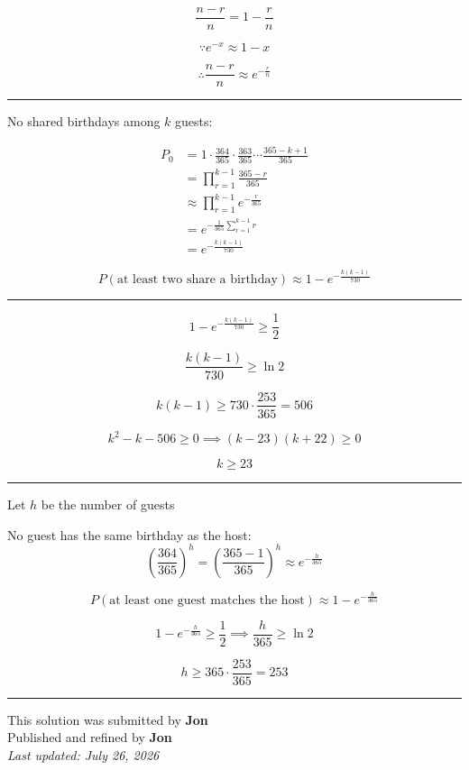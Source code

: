 \documentclass[12pt]{article}
\begin{document}
\newcommand{\ds}{\displaystyle}

$$\frac{n-r}{n}=1-\frac r n$$

$$\because e^{-x}\approx 1-x$$

$$\therefore \frac{n-r}{n}\approx e^{-\frac rn}$$

\bigskip\hrule\bigskip

No shared birthdays among $k$ guests:

\begin{align*}
P_0
&=1\cdot\frac{364}{365}\cdot\frac{363}{365}\cdots\frac{365-k+1}{365}\\
&=\prod_{r=1}^{k-1}\frac{365-r}{365}\\
&\approx \prod_{r=1}^{k-1}e^{-\frac r{365}}\\
&=e^{-\frac1{365}\sum_{r=1}^{k-1}r}\\
&=e^{-\frac{k(k-1)}{730}}
\end{align*}

$$P(\text{at least two share a birthday})
\approx 1-e^{-\frac{k(k-1)}{730}}$$

\bigskip\hrule\bigskip

$$1-e^{-\frac{k(k-1)}{730}}\geq\frac12$$

$$\frac{k(k-1)}{730}\geq \ln2$$

$$k(k-1)\geq 730\cdot\frac{253}{365}=506$$

$$k^2-k-506\geq 0\implies (k-23)(k+22)\geq 0$$

$$k\geq23$$

\bigskip\hrule\bigskip

Let $h$ be the number of guests

No guest has the same birthday as the host: 
$$\left(\frac{364}{365}\right)^h=\left(\frac{365-1}{365}\right)^h\approx e^{-\frac h{365}}$$

$$P(\text{at least one guest matches the host})\approx 1-e^{-\frac h{365}}$$

$$1-e^{-\frac h{365}}\geq\frac12\implies \frac h{365}\geq \ln2$$

$$h\geq365\cdot\frac{253}{365}=253$$

\bigskip
\hrule
\begin{center}
    This solution was submitted by \textbf{Jon}\\[4pt]
    Published and refined by \textbf{Jon}\\[8pt]
    \textit{Last updated: July 26, 2026}
\end{center}
\end{document}
